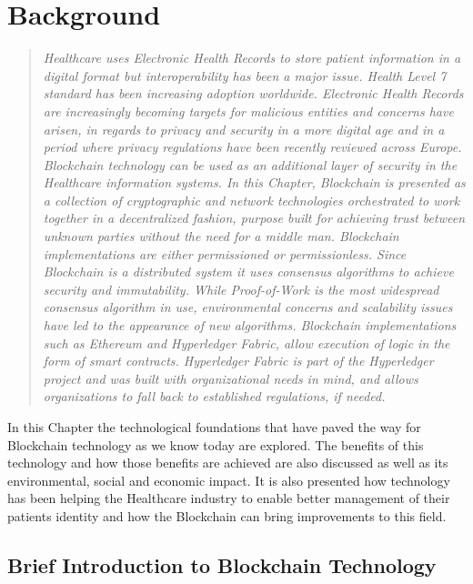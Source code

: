 \chapter{Background}\label{background}

\begin{quote} 
  \emph{Healthcare uses Electronic Health Records to store patient information
  in a digital format but interoperability has been a major issue.  Health
  Level 7 standard has been increasing adoption worldwide.  Electronic Health
  Records are increasingly becoming targets for malicious entities and concerns
  have arisen, in regards to privacy and security in a more digital age and in
  a period where privacy regulations have been recently reviewed across Europe.
  Blockchain technology can be used as an additional layer of security in the
  Healthcare information systems. In this Chapter, Blockchain is presented as a
  collection of cryptographic and network technologies orchestrated to work
  together in a decentralized fashion, purpose built for achieving trust
  between unknown parties without the need for a middle man. Blockchain
  implementations are either permissioned or permissionless. Since Blockchain
  is a distributed system it uses consensus algorithms to achieve security and
  immutability. While Proof-of-Work is the most widespread consensus algorithm
  in use, environmental concerns and scalability issues have led to the
  appearance of new algorithms.  Blockchain implementations such as Ethereum
  and Hyperledger Fabric, allow execution of logic in the form of smart
  contracts. Hyperledger Fabric is part of the Hyperledger project and was
  built with organizational needs in mind, and allows organizations to fall
  back to established regulations, if needed.}
\end{quote}


In this Chapter the technological foundations that have paved the way for
Blockchain technology as we know today are explored. The benefits of this
technology and how those benefits are achieved are also discussed as well as
its environmental, social and economic impact. It is also presented how
technology has been helping the Healthcare industry to enable better management
of their patients identity and how the Blockchain can bring improvements to
this field.

\section{Brief Introduction to Blockchain Technology}

